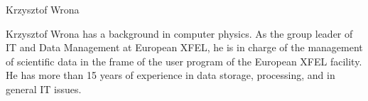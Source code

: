 \begin{participant}[type=leadPI,PM=1,gender=male]{Krzysztof Wrona}








  \medskip Krzysztof Wrona has a background in computer physics. As
  the group leader of IT and Data Management at European XFEL, he is
  in charge of the management of scientific data in the frame of the
  user program of the European XFEL facility. He has more than 15
  years of experience in data storage, processing, and in general IT
  issues.
\end{participant}

